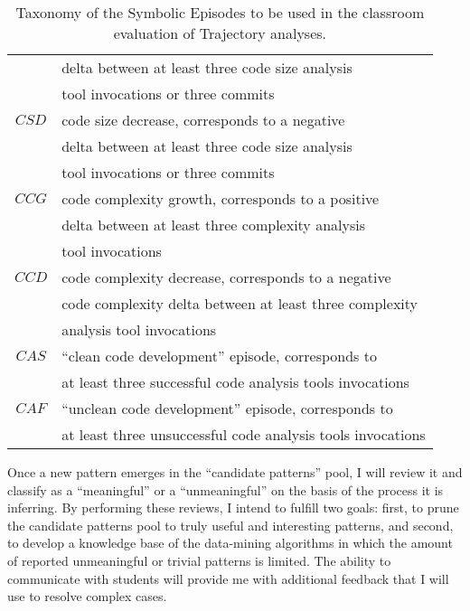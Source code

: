 \begin{table}
\begin{center}
\begin{tabular}{ | c | l | }
													& delta between at least three code size analysis \\
													& tool invocations or three commits \\
		\hline
		$CSD$ 								& code size decrease, corresponds to a negative \\
													& delta between at least three code size analysis \\
													& tool invocations or three commits \\																										
		\hline
		$CCG$ 								& code complexity growth, corresponds to a positive \\
													& delta between at least three complexity analysis \\
													& tool invocations \\
		\hline
		$CCD$ 								& code complexity decrease, corresponds to a negative \\
													& code complexity delta between at least three complexity \\
													& analysis tool invocations \\													
		\hline
		$CAS$ 								& ``clean code development'' episode, corresponds to \\
													& at least three successful code analysis tools invocations \\
		\hline
		$CAF$ 								& ``unclean code development'' episode, corresponds to \\
													& at least three unsuccessful code analysis tools invocations \\
		\hline		
	  \end{tabular}
    \caption{Taxonomy of the Symbolic Episodes to be used in the classroom evaluation of Trajectory analyses.}
    \label{fig:data_collected_intervals}
    \end{center}
\end{table}

Once a new pattern emerges in the ``candidate patterns'' pool, I will review it and classify as a ``meaningful'' or a ``unmeaningful'' on the basis of the process it is inferring. By performing these reviews, I intend to fulfill two goals: first, to prune the candidate patterns pool to truly useful and interesting patterns, and second, to develop a knowledge base of the data-mining algorithms in which the amount of reported unmeaningful or trivial patterns is limited. The ability to communicate with students will provide me with additional feedback that I will use to resolve complex cases.

